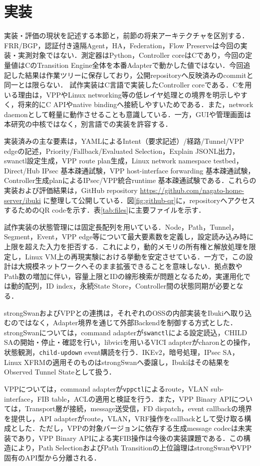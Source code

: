 \documentclass[11pt,a4paper,twoside]{ltjsarticle}
\begin{document}
\section{実装}
実装・評価の現状を記述する本節と，前節の将来アーキテクチャを区別する．FRR/BGP，認証付き遠隔Agent，HA，Federation，Flow Preserveは今回の実装・実測対象ではない．測定器はPython，Controller coreはCであり，今回の定量値はCのTransition Engine全体を本番Adapterで動かした値ではない．今回追記した結果は作業ツリーに保存しており，公開repositoryへ反映済みのcommitと同一とは限らない．
試作実装はC言語で実装したController coreである．Cを用いる理由は，VPPやLinux networking等の低レイヤ処理との境界を明示しやすく，将来的にC APIやnative bindingへ接続しやすいためである．また，network daemonとして軽量に動作させることも意識している．一方，GUIや管理画面は本研究の中核ではなく，別言語での実装を許容する．

実装済みの主な要素は，YAMLによるIntent（要求記述）/経路/Tunnel/VPP edgeの記述，Priority/Fallback/Evaluated Selection，Explain JSONL出力，swanctl設定生成，VPP route plan生成，Linux network namespace testbed，Direct/Hub IPsec 基本疎通試験，VPP host-interface forwarding 基本疎通試験，Controller生成planによるIPsec/VPP統合runtime 基本疎通試験である．これらの実装および評価結果は，GitHub repository \url{https://github.com/nagato-home-server/ibuki} に整理して公開している．図\ref{fig:github-qr}に，repositoryへアクセスするためのQR codeを示す．表\ref{tab:files}に主要ファイルを示す．

試作実装の状態管理には固定長配列を用いている．Node，Path，Tunnel，Segment，Event，VPP edge等について最大要素数を定義し，設定読み込み時に上限を超えた入力を拒否する．これにより，動的メモリの所有権と解放処理を限定し，Linux VM上の再現実験における挙動を安定させている．一方で，この設計は大規模ネットワークへそのまま拡張できることを意味しない．拠点数やPath数の増加に伴い，容量上限とIDの線形検索が問題となるため，実運用化では動的配列，ID index，永続State Store，Controller間の状態同期が必要となる．

strongSwanおよびVPPとの連携は，それぞれのOSSの内部実装をIbukiへ取り込むのではなく，Adapter境界を通じて外部Backendを制御する方式とした．strongSwanについては，command adapterが\texttt{swanctl}による設定読込，CHILD SAの開始・停止・確認を行い，libviciを用いるVICI adapterがcharonとの操作，状態観測，\texttt{child-updown} event購読を行う．IKEv2，暗号処理，IPsec SA，Linux XFRMの適用そのものはstrongSwanへ委譲し，Ibukiはその結果をObserved Tunnel Stateとして扱う．

VPPについては，command adapterが\texttt{vppctl}によるroute，VLAN sub-interface，FIB table，ACLの適用と検証を行う．また，VPP Binary APIについては，Transport層が接続，message送受信，FD dispatch，event callbackの境界を提供し，API adapterがroute，VLAN，VRF操作をcallbackとして受け取る構成とした．ただし，VPPの対象バージョンに依存する生成message codecは未実装であり，VPP Binary APIによる実FIB操作は今後の実装課題である．この構造により，Path SelectionおよびPath Transitionの上位論理はstrongSwanやVPP固有のAPI型から分離される．
\end{document}
